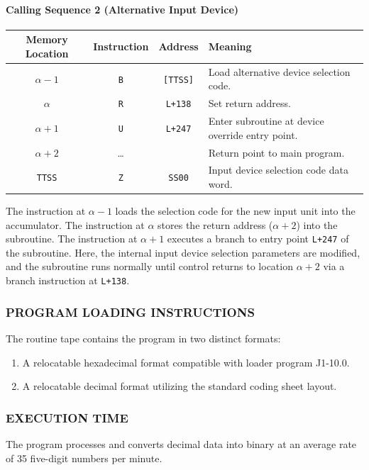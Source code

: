 \paragraph{Calling Sequence 2 (Alternative Input Device)}
\begin{table}[h!]
\centering
\begin{tabularx}{\textwidth}{cccX}
\toprule
\textbf{Memory Location} & \textbf{Instruction} & \textbf{Address} & \textbf{Meaning} \\
\midrule
$\alpha-1$   & \texttt{B} & \texttt{[TTSS]} & Load alternative device selection code. \\
$\alpha$     & \texttt{R} & \texttt{L+138}  & Set return address. \\
$\alpha+1$   & \texttt{U} & \texttt{L+247}  & Enter subroutine at device override entry point. \\
$\alpha+2$   & \dots      &                  & Return point to main program. \\
\midrule
\texttt{TTSS} & \texttt{Z} & \texttt{SS00}   & Input device selection code data word. \\
\bottomrule
\end{tabularx}
\end{table}
The instruction at $\alpha-1$ loads the selection code for the new input unit into the accumulator. The instruction at $\alpha$ stores the return address ($\alpha+2$) into the subroutine. The instruction at $\alpha+1$ executes a branch to entry point \texttt{L+247} of the subroutine. Here, the internal input device selection parameters are modified, and the subroutine runs normally until control returns to location $\alpha+2$ via a branch instruction at \texttt{L+138}.

\subsubsection*{PROGRAM LOADING INSTRUCTIONS}
The routine tape contains the program in two distinct formats:
\begin{enumerate}[label=\alph*)]
    \item A relocatable hexadecimal format compatible with loader program J1-10.0.
    \item A relocatable decimal format utilizing the standard coding sheet layout.
\end{enumerate}

\subsubsection*{EXECUTION TIME}
The program processes and converts decimal data into binary at an average rate of 35 five-digit numbers per minute.

